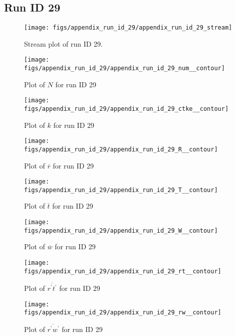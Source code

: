 \subsection{Run ID 29}
\begin{figure}[H]
\centering
\texttt{[image: figs/appendix\_run\_id\_29/appendix\_run\_id\_29\_stream]}
\caption{Stream plot of run ID 29.}
\label{fig:appendix_run_id_29_stream}
\end{figure}


\begin{figure}[H]
\centering
\texttt{[image: figs/appendix\_run\_id\_29/appendix\_run\_id\_29\_num\_\_contour]}
\caption{Plot of $N$ for run ID 29}
\label{fig:appendix_run_id_29_num__contour}
\end{figure}


\begin{figure}[H]
\centering
\texttt{[image: figs/appendix\_run\_id\_29/appendix\_run\_id\_29\_ctke\_\_contour]}
\caption{Plot of $k$ for run ID 29}
\label{fig:appendix_run_id_29_ctke__contour}
\end{figure}


\begin{figure}[H]
\centering
\texttt{[image: figs/appendix\_run\_id\_29/appendix\_run\_id\_29\_R\_\_contour]}
\caption{Plot of $\overline{r}$ for run ID 29}
\label{fig:appendix_run_id_29_R__contour}
\end{figure}


\begin{figure}[H]
\centering
\texttt{[image: figs/appendix\_run\_id\_29/appendix\_run\_id\_29\_T\_\_contour]}
\caption{Plot of $\overline{t}$ for run ID 29}
\label{fig:appendix_run_id_29_T__contour}
\end{figure}


\begin{figure}[H]
\centering
\texttt{[image: figs/appendix\_run\_id\_29/appendix\_run\_id\_29\_W\_\_contour]}
\caption{Plot of $\overline{w}$ for run ID 29}
\label{fig:appendix_run_id_29_W__contour}
\end{figure}


\begin{figure}[H]
\centering
\texttt{[image: figs/appendix\_run\_id\_29/appendix\_run\_id\_29\_rt\_\_contour]}
\caption{Plot of $\overline{r^\prime t^\prime}$ for run ID 29}
\label{fig:appendix_run_id_29_rt__contour}
\end{figure}


\begin{figure}[H]
\centering
\texttt{[image: figs/appendix\_run\_id\_29/appendix\_run\_id\_29\_rw\_\_contour]}
\caption{Plot of $\overline{r^\prime w^\prime}$ for run ID 29}
\label{fig:appendix_run_id_29_rw__contour}
\end{figure}


